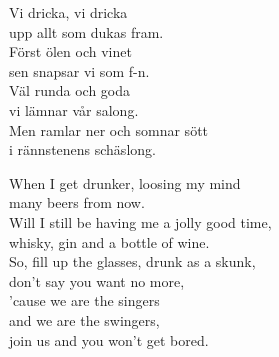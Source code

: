 \documentclass[a6paper,10pt]{article}
\begin{document}
\setlength{\oddsidemargin}{-0.47in}
\begin{center}
\end{center}
\begin{lyrics}
Vi dricka, vi dricka\\
upp allt som dukas fram.\\
Först ölen och vinet\\
sen snapsar vi som f-n.\\
Väl runda och goda\\
vi lämnar vår salong.\\
Men ramlar ner och somnar sött\\
i rännstenens schäslong.
\end{lyrics}
\vspace{40pt}
\begin{center}
\end{center}
\begin{lyrics}
When I get drunker, loosing my mind\\
many beers from now.\\
Will I still be having me a jolly good time,\\
whisky, gin and a bottle of wine.\\
So, fill up the glasses, drunk as a skunk,\\
don't say you want no more,\\
'cause we are the singers\\
and we are the swingers,\\
join us and you won't get bored.
\end{lyrics}
\end{document}
